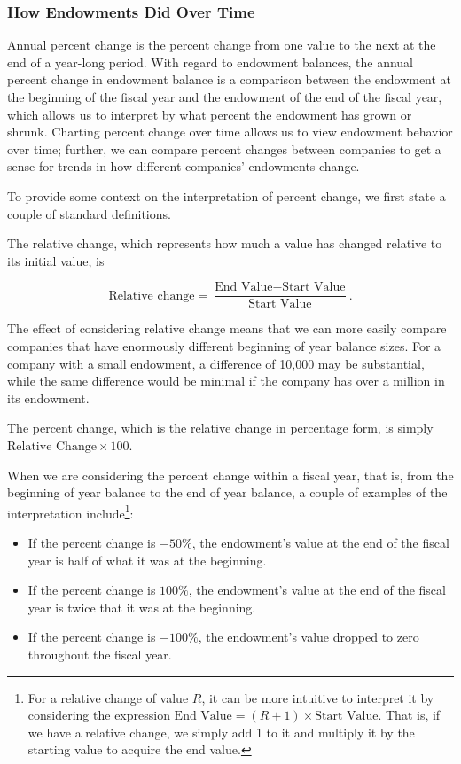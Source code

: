 \documentclass[Dance Data
Project,article,submit,moreauthors,pdftex]{mdpi}
\providecommand{\tightlist}{%
  \setlength{\itemsep}{0pt}\setlength{\parskip}{0pt}}
\begin{document}
\hypertarget{how-endowments-did-over-time}{%
\subsubsection{How Endowments Did Over
Time}\label{how-endowments-did-over-time}}

Annual percent change is the percent change from one value to the next
at the end of a year-long period. With regard to endowment balances, the
annual percent change in endowment balance is a comparison between the
endowment at the beginning of the fiscal year and the endowment of the
end of the fiscal year, which allows us to interpret by what percent the
endowment has grown or shrunk. Charting percent change over time allows
us to view endowment behavior over time; further, we can compare percent
changes between companies to get a sense for trends in how different
companies' endowments change.

To provide some context on the interpretation of percent change, we
first state a couple of standard definitions.

The relative change, which represents how much a value has changed
relative to its initial value, is

\[\text{Relative change} = \dfrac{\text{End Value} - \text{Start Value}}{ \text{Start Value}}.\]

The effect of considering relative change means that we can more easily
compare companies that have enormously different beginning of year
balance sizes. For a company with a small endowment, a difference of
10,000 may be substantial, while the same difference would be minimal if
the company has over a million in its endowment.

The percent change, which is the relative change in percentage form, is
simply \(\text{Relative Change} \times 100\).

When we are considering the percent change within a fiscal year, that
is, from the beginning of year balance to the end of year balance, a
couple of examples of the interpretation include\footnote{For a relative
  change of value \(R\), it can be more intuitive to interpret it by
  considering the expression
  \(\text{End Value} = (R+1) \times \text{Start Value}.\) That is, if we
  have a relative change, we simply add 1 to it and multiply it by the
  starting value to acquire the end value.}:

\begin{itemize}
\tightlist
\item
  If the percent change is \(-50\%\), the endowment's value at the end
  of the fiscal year is half of what it was at the beginning.
\item
  If the percent change is \(100\%\), the endowment's value at the end
  of the fiscal year is twice that it was at the beginning.\\
\item
  If the percent change is \(-100\%\), the endowment's value dropped to
  zero throughout the fiscal year.
\end{itemize}
\end{document}
